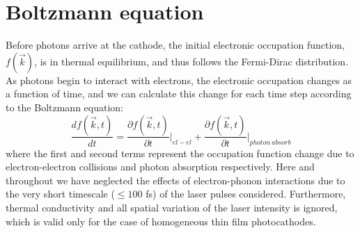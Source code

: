 \section{Boltzmann equation}

Before photons arrive at the cathode, the initial electronic occupation function, $f(\vec{k})$, is in thermal equilibrium, and thus follows the Fermi-Dirac distribution. As photons begin to interact with electrons, the electronic occupation changes as a function of time, and we can calculate this change for each time step according to the Boltzmann equation:
\begin{equation}
	\frac{d f(\vec{k},t)}{d t} = \frac{\partial f(\vec{k},t)}{\partial t}\biggr|_{el-el} +  \frac{\partial f(\vec{k},t)}{\partial t}\biggr|_{photon\: absorb}
	\label{bolt}
\end{equation}
where the first and second terms represent the occupation function change due to electron-electron collisions and photon absorption respectively. Here and throughout we have neglected the effects of electron-phonon interactions due to the very short timescale ($\leq 100$ fs) of the laser pulses considered. Furthermore, thermal conductivity and all spatial variation of the laser intensity is ignored, which is valid only for the case of homogeneous thin film photocathodes.\cite{boltzmann}

